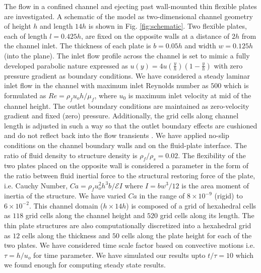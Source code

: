 \documentclass[final,3p,10pt,times,review,authoryear]{elsarticle}
\begin{document}
	The flow in a confined channel and ejecting past wall-mounted thin flexible plates are investigated. A schematic of the model as two-dimensional channel geometry of height $h$ and length $14h$ is shown in Fig. \ref{fig:schematic}. Two flexible plates, each of length $l = 0.425h$, are fixed on the opposite walls at a distance of $2h$ from the channel inlet. The thickness of each plate is $b = 0.05h$ and width $w=0.125h$ (into the plane). The inlet flow profile across the channel is set to mimic a fully developed parabolic nature expressed as $u(y)=4u\left(\frac{y}{h}\right)\left(1-\frac{y}{h}\right)$ with zero pressure gradient as boundary conditions. We have considered a steady laminar inlet flow in the channel with maximum inlet Reynolds number as $500$ which is formulated as $Re={\rho_fu_o h}/\mu_f$, where $u_0$ is maximum inlet velocity at mid of the channel height. The outlet boundary conditions are maintained as zero-velocity gradient and fixed (zero) pressure. Additionally, the grid cells along channel length is adjusted in such a way so that the outlet boundary effects are cushioned and do not reflect back into the flow transients . We have applied no-slip conditions on the channel boundary walls and on the fluid-plate interface. The ratio of fluid density to structure density is $\rho_f / \rho_s = 0.02$. The flexibility of the two plates placed on the opposite wall is considered a parameter in the form of the ratio between fluid inertial force to the structural restoring force of the plate, i.e. Cauchy Number, $Ca=\rho_f u_o^2 h^3 b/{\mathcal{E}I} $ where $I=bw^3/12$ is the area moment of inertia of the structure. We have varied $Ca$ in the range of $8\times10^{-9}$ (rigid) to $6\times10^{-2}$. This channel domain ($h\times14h$) is composed of a grid of hexahedral cells as $118$ grid cells along the channel height and $520$ grid cells along its length. The thin plate structures are also computationally discretized into a hexahedral grid as $12$ cells along the thickness and $50$ cells along the plate height for each of the two plates. We have considered time scale factor based on convective motions i.e. $\tau={h/u_o}$ for time parameter. We have simulated our results upto $t/\tau=10$ which we found enough for computing steady state results.
	
\end{document}
